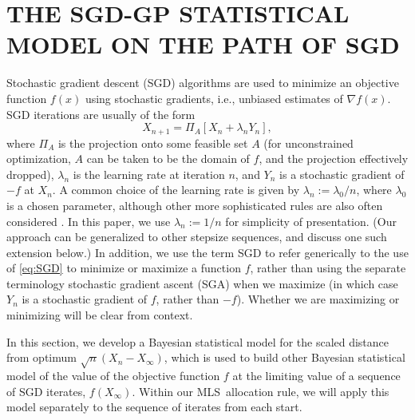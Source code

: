 \documentclass[12pt,english]{article}
\newcommand{\abbrv}{MLS}
\begin{document}
\section{THE SGD-GP STATISTICAL MODEL ON THE PATH OF SGD}
\label{statistical_model}

Stochastic gradient descent (SGD) algorithms are used to minimize an objective function $f(x)$ using stochastic gradients, i.e., unbiased estimates of $\nabla f(x)$. SGD iterations are usually of the form
\begin{equation}
X_{n+1}=\Pi_{A}\left[X_{n}+\lambda_{n}Y_{n}\right],\label{eq:SGD}
\end{equation}
where $\Pi_{A}$ is the projection onto some feasible set $A$ (for unconstrained optimization, $A$ can be taken to be the domain of $f$, and the projection effectively dropped),
$\lambda_{n}$ is the learning rate at iteration $n$, and $Y_{n}$ is a stochastic gradient of $-f$ at $X_{n}$.  A common choice of the learning rate is given by $\lambda_{n}:=\lambda_{0}/n$, where $\lambda_{0}$ is a chosen parameter, although other more sophisticated rules are also often considered \citep{powell2007approximate}. In this paper, we use  $\lambda_{n}:=1/n$ for simplicity of presentation. (Our approach can be generalized to other stepsize sequences, and discuss one such extension below.)  In addition, we use the term SGD to refer generically to the use of \eqref{eq:SGD} to minimize or maximize a function $f$, rather than using the separate terminology stochastic gradient ascent (SGA) when we maximize (in which case $Y_n$ is a stochastic gradient of $f$, rather than $-f$).  Whether we are maximizing or minimizing will be clear from context.

In this section, we develop a Bayesian statistical model for the scaled distance from optimum $\sqrt{n}\left(X_{n}-X_{\infty}\right)$, which is used to build other Bayesian statistical model of the value of the objective function $f$ at the limiting value of a sequence of SGD iterates, $f(X_\infty)$.  Within our \abbrv\ allocation rule, we will apply this model separately to the sequence of iterates from each start.
\end{document}
